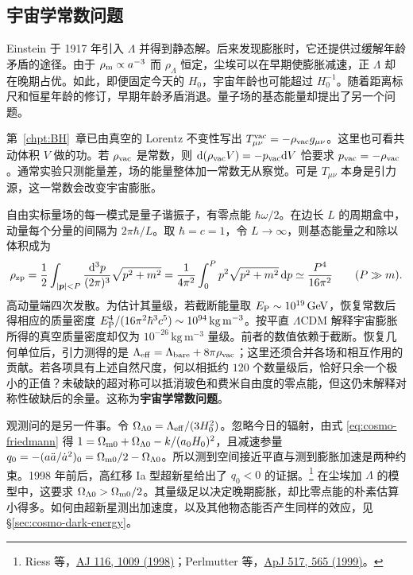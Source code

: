 \subsection{宇宙学常数问题}\label{sec:cosmo-vacuum}

Einstein 于 1917 年引入 $\Lambda$ 并得到静态解。后来发现膨胀时，它还提供过缓解年龄矛盾的途径。由于 $\rho_{\rm m}\propto a^{-3}$ 而 $\rho_\Lambda$ 恒定，尘埃可以在早期使膨胀减速，正 $\Lambda$ 却在晚期占优。如此，即便固定今天的 $H_0$，宇宙年龄也可能超过 $H_0^{-1}$。随着距离标尺和恒星年龄的修订，早期年龄矛盾消退。量子场的基态能量却提出了另一个问题。

第~\ref{chpt:BH}~章已由真空的 Lorentz 不变性写出 $T^{\rm vac}_{\mu\nu}=-\rho_{\rm vac}g_{\mu\nu}$。这里也可看共动体积 $V$ 做的功。若 $\rho_{\rm vac}$ 是常数，则 $\dd(\rho_{\rm vac}V)=-p_{\rm vac}\dd V$ 恰要求 $p_{\rm vac}=-\rho_{\rm vac}$。通常实验只测能量差，场的能量整体加一常数无从察觉。可是 $T_{\mu\nu}$ 本身是引力源，这一常数会改变宇宙膨胀。

自由实标量场的每一模式是量子谐振子，有零点能 $\hbar\omega/2$。在边长 $L$ 的周期盒中，动量每个分量的间隔为 $2\pi\hbar/L$。取 $\hbar=c=1$，令 $L\to\infty$，则基态能量之和除以体积成为
\begin{equation}\label{eq:cosmo-vacuum-cutoff}
    \rho_{\rm zp}=\frac12\int_{|\bm p|<P}\frac{\dd^3p}{(2\pi)^3}\sqrt{p^2+m^2}
      =\frac{1}{4\pi^2}\int_0^P p^2\sqrt{p^2+m^2}\,\dd p
      \simeq\frac{P^4}{16\pi^2}\qquad(P\gg m).
\end{equation}
高动量端四次发散。为估计其量级，若截断能量取 $E_{\rm P}\sim10^{19}\,\mathrm{GeV}$，恢复常数后得相应的质量密度 $E_{\rm P}^4/(16\pi^2\hbar^3 c^5)\sim10^{94}\,\mathrm{kg\,m^{-3}}$。按平直 $\Lambda$CDM 解释宇宙膨胀所得的真空质量密度却仅为 $10^{-26}\,\mathrm{kg\,m^{-3}}$ 量级。前者的数值依赖于截断。恢复几何单位后，引力测得的是 $\Lambda_{\rm eff}=\Lambda_{\rm bare}+8\pi\rho_{\rm vac}$；这里还须合并各场和相互作用的贡献。若各项具有上述自然尺度，何以相抵约 $120$ 个数量级后，恰好只余一个极小的正值？未破缺的超对称可以抵消玻色和费米自由度的零点能，但这仍未解释对称性破缺后的余量。这称为\textbf{宇宙学常数问题}。

观测问的是另一件事。令 $\Omega_{\Lambda0}=\Lambda_{\rm eff}/(3H_0^2)$。忽略今日的辐射，由式 \eqref{eq:cosmo-friedmann} 得 $1=\Omega_{\rm m0}+\Omega_{\Lambda0}-k/(a_0H_0)^2$，且减速参量 $q_0=-(a\ddot a/\dot a^2)_0=\Omega_{\rm m0}/2-\Omega_{\Lambda0}$。所以测到空间接近平直与测到膨胀加速是两种约束。1998 年前后，高红移 Ia 型超新星给出了 $q_0<0$ 的证据。\footnote{Riess 等，\href{https://arxiv.org/abs/astro-ph/9805201}{AJ 116, 1009 (1998)}；Perlmutter 等，\href{https://arxiv.org/abs/astro-ph/9812133}{ApJ 517, 565 (1999)}。} 在尘埃加 $\Lambda$ 的模型中，这要求 $\Omega_{\Lambda0}>\Omega_{\rm m0}/2$。其量级足以决定晚期膨胀，却比零点能的朴素估算小得多。如何由超新星测出加速度，以及其他物态能否产生同样的效应，见 \S\ref{sec:cosmo-dark-energy}。


